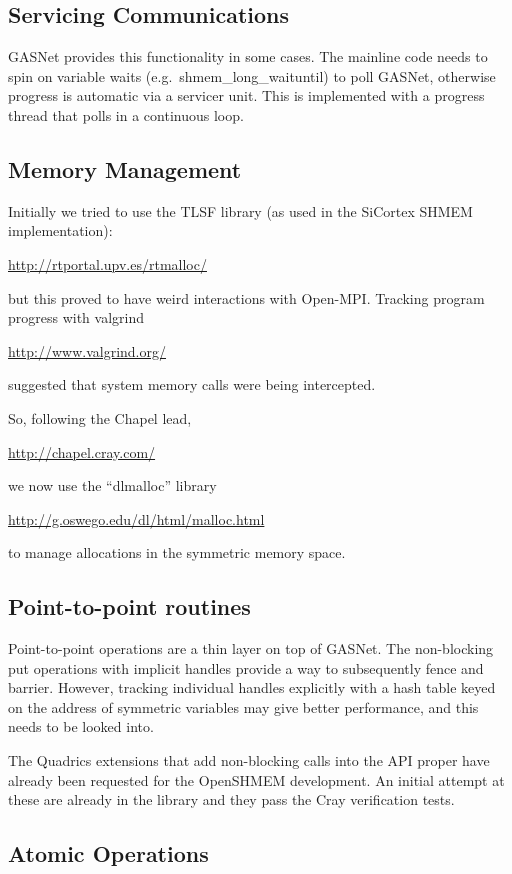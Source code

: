 \documentclass[english]{article}
\begin{document}
\subsection{Servicing Communications}

GASNet provides this functionality in some cases. The mainline code
needs to spin on variable waits (e.g.\ shmem\_long\_waituntil) to poll
GASNet, otherwise progress is automatic via a servicer unit.  This is
implemented with a progress thread that polls in a continuous loop.

\subsection{Memory Management}

Initially we tried to use the TLSF library (as used in the SiCortex
SHMEM implementation):

\url{http://rtportal.upv.es/rtmalloc/}

but this proved to have weird interactions with Open-MPI. Tracking
program progress with valgrind

\url{http://www.valgrind.org/}

suggested that system memory calls were
being intercepted.

So, following the Chapel lead,

\url{http://chapel.cray.com/}

we now use the ``dlmalloc'' library

\url{http://g.oswego.edu/dl/html/malloc.html}

to manage allocations in the symmetric memory space.

\subsection{Point-to-point routines}

Point-to-point operations are a thin layer on top of GASNet. The
non-blocking put operations with implicit handles provide a way to
subsequently fence and barrier. However, tracking individual handles
explicitly with a hash table keyed on the address of symmetric
variables may give better performance, and this needs to be looked
into.

The Quadrics extensions that add non-blocking calls into the API
proper have already been requested for the OpenSHMEM development. An
initial attempt at these are already in the library and they pass the
Cray verification tests.

\subsection{Atomic Operations}
\end{document}
